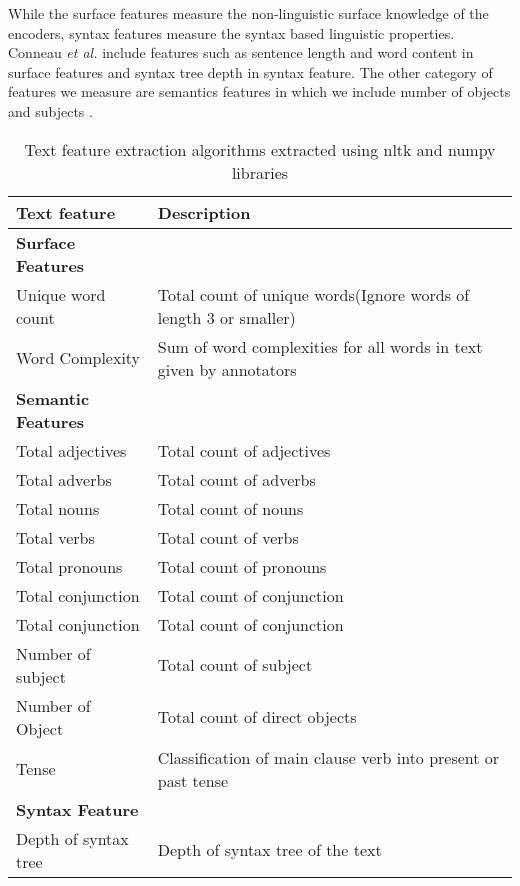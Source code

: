 \documentclass[sigconf]{acmart}
\begin{document}
While the surface features measure the non-linguistic surface knowledge of the encoders, syntax features measure the syntax based linguistic properties. Conneau \textit{et al.} \cite{conneau2018you} include features such as sentence length and word content in surface features and syntax tree depth in syntax feature. The other category of features we measure are semantics features in which we include number of objects and subjects \cite{conneau2018you}.


\begin{table*}[ht]
\begin{tabular}{@{}|l|l|@{}}  \toprule
\textbf{Text feature} & \textbf{Description}\\ \midrule \midrule
\textbf{Surface Features} \\ \midrule
Unique word count & Total count of unique words(Ignore words of length 3 or smaller)\\ \midrule
Word Complexity & Sum of word complexities for all words in text given by annotators\\ \midrule

\textbf{Semantic Features} \\ \midrule
Total adjectives & Total count of adjectives \\ \midrule
Total adverbs & Total count of adverbs\\ \midrule
Total nouns & Total count of nouns\\ \midrule
Total verbs & Total count of verbs\\ \midrule
Total pronouns & Total count of pronouns\\ \midrule
Total conjunction & Total count of conjunction\\ \midrule
Total conjunction & Total count of conjunction\\ \midrule
Number of subject & Total count of subject\\ \midrule
Number of Object & Total count of direct objects\\ \midrule
Tense & Classification of main clause verb into present or past tense\\ \midrule

\textbf{Syntax Feature} \\ \midrule
Depth of syntax tree & Depth of syntax tree of the text\\ 
\bottomrule
\end{tabular}
\caption{ \label{table: Text feature extraction}Text feature extraction algorithms extracted using nltk and numpy libraries
}
\end{table*}
\end{document}
